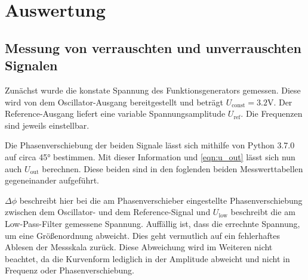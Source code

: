 \newpage
\section{Auswertung}
\subsection{Messung von verrauschten und unverrauschten Signalen}
\label{sec:Auswertung}

Zunächst wurde die konstate Spannung des Funktionsgenerators gemessen. Diese wird von dem Oscillator-Ausgang bereitgestellt und beträgt $U_\text{const} = 3.2$V\!. Der Reference-Ausgang liefert eine variable Spannungsamplitude $U_\text{ref}$.
Die Frequenzen sind jeweils einstellbar.

Die Phasenverschiebung der beiden Signale lässt sich mithilfe von Python 3.7.0 auf circa 45° bestimmen. Mit dieser Information und \autoref{eqn:u_out} lässt sich nun auch $U_\text{out}$ berechnen.
Diese beiden sind in den foglenden beiden Messwerttabellen gegeneinander aufgeführt.


$\Delta\phi$ beschreibt hier bei die am Phasenverschieber eingestellte Phasenverschiebung zwischen dem Oscillator- und dem Reference-Signal und $U_\text{low}$ beschreibt die am
Low-Pass-Filter gemessene Spannung. Auffällig ist, dass die errechnte Spannung, um eine Größenordnung abweicht. Dies geht vermutlich auf ein fehlerhaftes Ablesen der Messskala zurück. Diese Abweichung wird im Weiteren nicht beachtet, da die Kurvenform lediglich in der Amplitude abweicht und nicht in Frequenz oder Phasenverschiebung.

